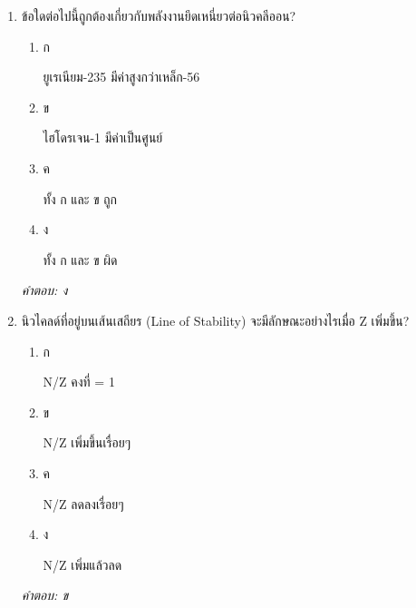 \documentclass[12pt]{article}
\begin{document}
\begin{enumerate}[label=\arabic*., itemsep=0.5\baselineskip, topsep=0.5\baselineskip, leftmargin=*]
\item ข้อใดต่อไปนี้ถูกต้องเกี่ยวกับพลังงานยึดเหนี่ยวต่อนิวคลีออน?
\begin{enumerate}[label=\alph*)., itemsep=0.3\baselineskip, topsep=0.3\baselineskip]
\item ก\ 
\begin{minipage}[t]{0.9\linewidth}
\raggedright ยูเรเนียม-235 มีค่าสูงกว่าเหล็ก-56
\end{minipage}
\item ข\ 
\begin{minipage}[t]{0.9\linewidth}
\raggedright ไฮโดรเจน-1 มีค่าเป็นศูนย์
\end{minipage}
\item ค\ 
\begin{minipage}[t]{0.9\linewidth}
\raggedright ทั้ง ก และ ข ถูก
\end{minipage}
\item ง\ 
\begin{minipage}[t]{0.9\linewidth}
\raggedright ทั้ง ก และ ข ผิด
\end{minipage}
\end{enumerate}
\vspace{-0.3\baselineskip}
\begin{small}
\textit{คำตอบ: ง}
\end{small}

\item นิวไคลด์ที่อยู่บนเส้นเสถียร (Line of Stability) จะมีลักษณะอย่างไรเมื่อ Z เพิ่มขึ้น?
\begin{enumerate}[label=\alph*)., itemsep=0.3\baselineskip, topsep=0.3\baselineskip]
\item ก\ 
\begin{minipage}[t]{0.9\linewidth}
\raggedright N/Z คงที่ = 1
\end{minipage}
\item ข\ 
\begin{minipage}[t]{0.9\linewidth}
\raggedright N/Z เพิ่มขึ้นเรื่อยๆ
\end{minipage}
\item ค\ 
\begin{minipage}[t]{0.9\linewidth}
\raggedright N/Z ลดลงเรื่อยๆ
\end{minipage}
\item ง\ 
\begin{minipage}[t]{0.9\linewidth}
\raggedright N/Z เพิ่มแล้วลด
\end{minipage}
\end{enumerate}
\vspace{-0.3\baselineskip}
\begin{small}
\textit{คำตอบ: ข}
\end{small}


\end{enumerate}
\end{document}
